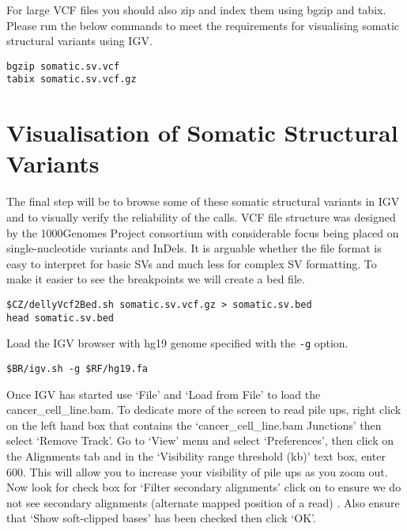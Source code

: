 \begin{steps}
\begin{information}
For large VCF files you should also zip and index them using bgzip and tabix. Please run the below commands to meet the requirements for visualising somatic structural variants using IGV.  
\end{information}

\begin{steps}
\begin{lstlisting}
bgzip somatic.sv.vcf
tabix somatic.sv.vcf.gz
\end{lstlisting}
\end{steps}



\section{Visualisation of Somatic Structural Variants}

\begin{information}
The final step will be to browse some of these somatic structural variants in IGV and to visually verify the reliability of the calls. VCF file structure was designed by the 1000Genomes Project consortium with considerable focus being placed on single-nucleotide variants and InDels. It is arguable whether the file format is easy to interpret for basic SVs and much less for complex SV formatting. To make it easier to see the breakpoints we will create a bed file. 

\end{information}
\begin{steps}
\begin{lstlisting}
$CZ/dellyVcf2Bed.sh somatic.sv.vcf.gz > somatic.sv.bed
head somatic.sv.bed
\end{lstlisting}
\end{steps}

\begin{steps}
Load the IGV browser with hg19 genome specified with the \texttt{-g} option.
\begin{lstlisting}
$BR/igv.sh -g $RF/hg19.fa
\end{lstlisting}
\end{steps}

\begin{information}
Once IGV has started use ‘File’ and ‘Load from File’ to load the cancer_cell_line.bam. To dedicate more of the screen to read pile ups, right click on the left hand box that contains the ‘cancer_cell_line.bam Junctions’ then select ‘Remove Track’. Go to ‘View’ menu and select ‘Preferences’, then click on the Alignments tab and in the ‘Visibility range threshold (kb)’ text box, enter 600. This will allow you to increase your visibility of pile ups as you zoom out. Now look for check box for ‘Filter secondary alignments’ click on to ensure we do not see secondary alignments (alternate mapped position of a read) . Also ensure that ‘Show soft-clipped bases’ has been checked then click ‘OK’.
 

\end{information}
\end{steps}
